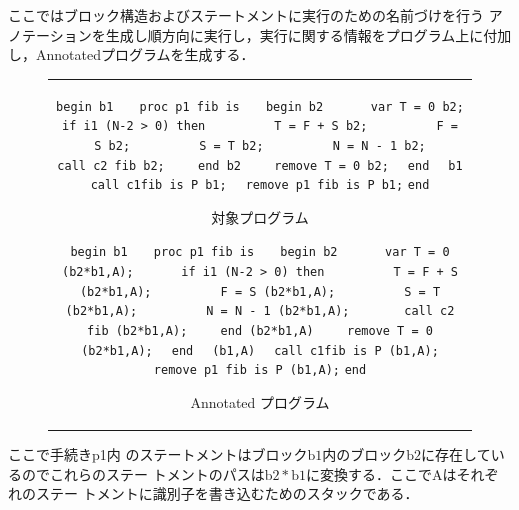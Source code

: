 \documentclass[submit,PRO]{ipsj}
\newcommand{\blabel}[1]{\mathrm{b}#1}
\def\|{\verb|}
\begin{document}
%\subsection{Annotatedプログラム}

ここではブロック構造およびステートメントに実行のための名前づけを行う
アノテーションを生成し順方向に実行し，実行に関する情報をプログラム上に付加
し，Annotatedプログラムを生成する．

\begin{figure}[tb]
\begin{center}
\begin{tabular}{c}
\begin{minipage}[t]{0.5\columnwidth}
\footnotesize
\setbox0\vbox{
\hbox{\|begin b1|}
\hbox{\|   proc p1 fib is|}
\hbox{\|   begin b2|}
\hbox{\|      var T = 0 b2;|}
\hbox{\|      if i1 (N-2 > 0) then|}
\hbox{\|         T = F + S b2;|}
\hbox{\|         F = S b2;|}
\hbox{\|         S = T b2;|}
\hbox{\|         N = N - 1 b2;|}
\hbox{\|       call c2 fib b2;|}
\hbox{\|    end b2|}
\hbox{\|    remove T = 0 b2;|}
\hbox{\|  end|}
\hbox{\|  b1|}
\hbox{\|  call c1fib is P b1;|}
\hbox{\|  remove p1 fib is P b1;|}
\hbox{\|end|}
}
\centerline{\fbox{\box0}}
\caption{対象プログラム}
\ecaption{Original Program}
\label{fig:Horiginal}
\end{minipage}

\begin{minipage}[t]{0.5\columnwidth}
\footnotesize
\setbox0\vbox{
\hbox{\|begin b1|}
\hbox{\|   proc p1 fib is|}
\hbox{\|   begin b2|}
\hbox{\|      var T = 0 (b2*b1,A);|}
\hbox{\|      if i1 (N-2 > 0) then|}
\hbox{\|         T = F + S (b2*b1,A);|}
\hbox{\|         F = S (b2*b1,A);|}
\hbox{\|         S = T (b2*b1,A);|}
\hbox{\|         N = N - 1 (b2*b1,A);|}
\hbox{\|       call c2 fib (b2*b1,A);|}
\hbox{\|    end (b2*b1,A)|}
\hbox{\|    remove T = 0 (b2*b1,A);|}
\hbox{\|  end|}
\hbox{\|  (b1,A)|}
\hbox{\|  call c1fib is P (b1,A);|}
\hbox{\|  remove p1 fib is P (b1,A);|}
\hbox{\|end|}
}
\centerline{\fbox{\box0}}
\caption{Annotated プログラム}
\ecaption{Annotated Program}
\label{fig:Hannotated}
\end{minipage}
\end{tabular}
\end{center}
\end{figure}

ここで手続きp1内
のステートメントはブロック$\blabel{1}$内のブロック$\blabel{2}$に存在しているのでこれらのステー
トメントのパスは$\blabel{2}\ast\blabel{1}$に変換する．ここでAはそれぞれのステー
トメントに識別子を書き込むためのスタックである．
\end{document}
